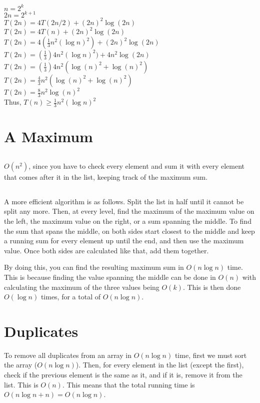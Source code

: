 \documentclass[14pt, letterpaper]{article}
\begin{document}
\subsection{}
$n = 2^k$ \\
$2n = 2^{k+1}$ \\
$T(2n) = 4T(2n/2) + (2n)^2\log(2n)$ \\
$T(2n) = 4T(n) + (2n)^2\log(2n)$ \\
$T(2n) = 4(\frac{1}{3}n^2(\log n)^2) + (2n)^2\log(2n)$ \\
$T(2n) = (\frac{1}{3})4n^2(\log n)^2) + 4n^2\log(2n)$ \\
$T(2n) = (\frac{1}{3})4n^2(\log(n)^2 + \log(n)^2)$ \\
$T(2n) = \frac{4}{3}n^2(\log(n)^2 + \log(n)^2)$ \\
$T(2n) = \frac{8}{3}n^2\log(n)^2$ \\
Thus, $T(n) \geq \frac{1}{3}n^2(\log n)^2$ \\

\section{A Maximum}
\subsection{}
$O(n^2)$, since you have to check every element and sum it with every element
that comes after it in the list, keeping track of the maximum sum.

\subsection{}
A more efficient algorithm is as follows. Split the list in half until it
cannot be split any more. Then, at every level, find the maximum of the maximum 
value on the left, the maximum value on the right, or a sum spanning the 
middle. To find the sum that spans the middle, on both sides start closest to 
the middle and keep a running sum for every element up until the end, and then 
use the maximum value. Once both sides are calculated like that, add them 
together.

By doing this, you can find the resulting maximum sum in $O(n\log n)$ time.
This is because finding the value spanning the middle can be done in $O(n)$ 
with calculating the maximum of the three values being $O(k)$. This is then
done $O(\log n)$ times, for a total of $O(n\log n)$.

\section{Duplicates}
To remove all duplicates from an array in $O(n\log n)$ time, first we must sort
the array ($O(n\log n)$). Then, for every element in the list (except the 
first), check if the previous element is the same as it, and if it is, remove
it from the list. This is $O(n)$. This means that the total running time is 
$O(n\log n + n) = O(n\log n)$.
\end{document}
